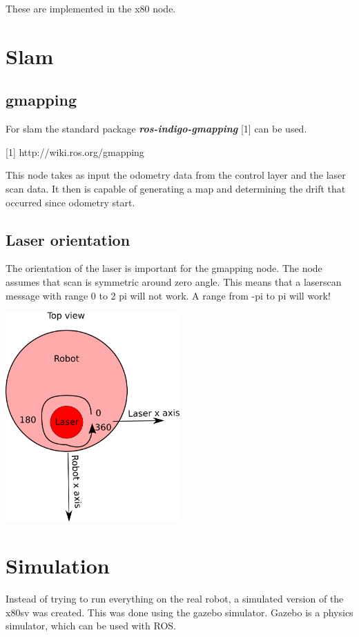 \documentclass[a4paper]{article}
\newcommand{\rospackage}[1]{\textbf{\textit{#1}}}
\begin{document}
These are implemented in the x80 node.

\section{Slam}

\subsection{gmapping}

For slam the standard package \rospackage{ros-indigo-gmapping} [1] can be used. 

[1] http://wiki.ros.org/gmapping

This node takes as input the odometry data from the control layer and the laser scan
data. It then is capable of generating a map and determining the drift that occurred
since odometry start.

\subsection{Laser orientation}
The orientation of the laser is important for the gmapping node. The node assumes that
scan is symmetric around zero angle. This means that a laserscan message with range
0 to 2 pi will not work. A range from -pi to pi will work!

\includegraphics[width=0.5\textwidth,height=\textheight,keepaspectratio]{img/laser_orientation.png}

\section{Simulation}
Instead of trying to run everything on the real robot, a simulated version of the x80sv
was created. This was done using the gazebo simulator. Gazebo is a physics simulator, which can be
used with ROS.
\end{document}
